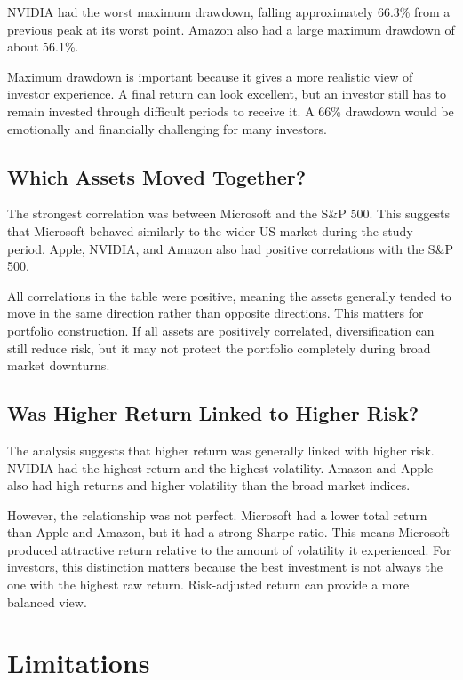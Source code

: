 \documentclass[12pt,a4paper]{article}
\begin{document}
NVIDIA had the worst maximum drawdown, falling approximately 66.3\% from a previous peak at its worst point. Amazon also had a large maximum drawdown of about 56.1\%.

Maximum drawdown is important because it gives a more realistic view of investor experience. A final return can look excellent, but an investor still has to remain invested through difficult periods to receive it. A 66\% drawdown would be emotionally and financially challenging for many investors.

\subsection{Which Assets Moved Together?}

The strongest correlation was between Microsoft and the S\&P 500. This suggests that Microsoft behaved similarly to the wider US market during the study period. Apple, NVIDIA, and Amazon also had positive correlations with the S\&P 500.

All correlations in the table were positive, meaning the assets generally tended to move in the same direction rather than opposite directions. This matters for portfolio construction. If all assets are positively correlated, diversification can still reduce risk, but it may not protect the portfolio completely during broad market downturns.

\subsection{Was Higher Return Linked to Higher Risk?}

The analysis suggests that higher return was generally linked with higher risk. NVIDIA had the highest return and the highest volatility. Amazon and Apple also had high returns and higher volatility than the broad market indices.

However, the relationship was not perfect. Microsoft had a lower total return than Apple and Amazon, but it had a strong Sharpe ratio. This means Microsoft produced attractive return relative to the amount of volatility it experienced. For investors, this distinction matters because the best investment is not always the one with the highest raw return. Risk-adjusted return can provide a more balanced view.

\section{Limitations}
\end{document}
